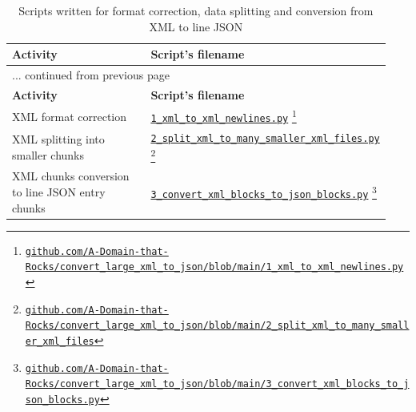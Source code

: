 \begin{center}
	\vspace*{-0.25cm}
	\begin{longtable}{p{0.47\linewidth}p{0.47\linewidth}}
		\hline \hline
		\textbf{Activity} & \textbf{Script's filename}\\
		\hline \hline
		\endfirsthead
		
		\multicolumn{2}{l}{... continued from previous page}\\
		\hline \hline
		\textbf{Activity} & \textbf{Script's filename}\\
		\hline \hline
		\endhead
		
		\hline
		\caption*{\tablename\ \thetable{}: \nameref*{longtable:dataconversion}. Continues on next page ...}
		\vspace*{0.5cm}
		\endfoot
		
		\hline
		\caption{Scripts written for format correction, data splitting and conversion from XML to line JSON}\label{longtable:dataconversion}
		\vspace*{0.5cm}
		\endlastfoot

		XML format correction & \href{https://github.com/A-Domain-that-Rocks/convert_large_xml_to_json/blob/main/1_xml_to_xml_newlines.py}{\texttt{1\_xml\_to\_xml\_newlines.py}}%
		\footnote{\href{https://github.com/A-Domain-that-Rocks/convert_large_xml_to_json/blob/main/1_xml_to_xml_newlines.py}{\texttt{github.com/A-Domain-that-Rocks/convert\_large\_xml\_to\_json/blob/main/1\_xml\_to\_xml\_newlines.py}}}\\
		\hline
		XML splitting into smaller chunks & \href{https://github.com/A-Domain-that-Rocks/convert_large_xml_to_json/blob/main/2_split_xml_to_many_smaller_xml_files.py}{\texttt{2\_split\_xml\_to\_many\_smaller\_xml\_files.py}}%
		\footnote{\href{https://github.com/A-Domain-that-Rocks/convert_large_xml_to_json/blob/main/2_split_xml_to_many_smaller_xml_files.py}{\texttt{github.com/A-Domain-that-Rocks/convert\_large\_xml\_to\_json/blob/main/2\_split\_xml\_to\_many\_smaller\_xml\_files}}}\\
		\hline
		XML chunks conversion to line JSON entry chunks & \href{https://github.com/A-Domain-that-Rocks/convert_large_xml_to_json/blob/main/3_convert_xml_blocks_to_json_blocks.py}{\texttt{3\_convert\_xml\_blocks\_to\_json\_blocks.py}}%
		\footnote{\href{https://github.com/A-Domain-that-Rocks/convert_large_xml_to_json/blob/main/3_convert_xml_blocks_to_json_blocks.py}{\texttt{github.com/A-Domain-that-Rocks/convert\_large\_xml\_to\_json/blob/main/3\_convert\_xml\_blocks\_to\_json\_blocks.py}}}\\
		\hline
	\end{longtable}
	\vspace*{-1.35cm}
\end{center}

